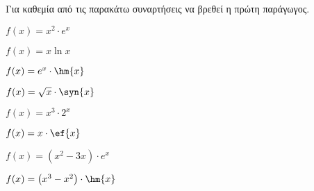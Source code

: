 Για καθεμία από τις παρακάτω συναρτήσεις να βρεθεί η πρώτη παράγωγος.
\begin{multicols}{2}
\begin{alist}
\item $ f(x)=x^2\cdot e^x $
\item $ f(x)=x\ln{x} $
\item $ f(x)=e^x\cdot\hm{x} $
\item $ f(x)=\sqrt{x}\cdot\syn{x} $
\item $ f(x)=x^3\cdot 2^x $
\item $ f(x)=x\cdot\ef{x} $
\item $ f(x)=\left(x^2-3x\right)\cdot e^x $
\item $ f(x)=\left(x^3-x^2\right)\cdot\hm{x} $
\end{alist}
\end{multicols}
